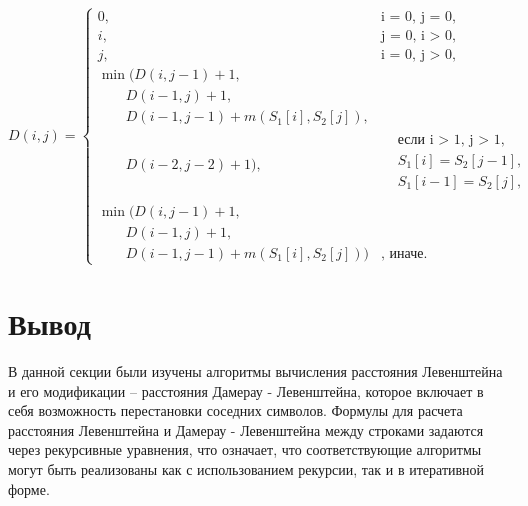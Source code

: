 \begin{equation}
	\label{eq:ref3}
	D(i, j) = 
	\begin{cases}
		0, &\text{i = 0, j = 0,}\\
		i, &\text{j = 0, i > 0,}\\
		j, &\text{i = 0, j > 0,}\\
		\min (  D(i, j - 1) + 1,\\
		\qquad D(i - 1, j) + 1,\\
		\qquad D(i - 1, j - 1) + m(S_{1}[i], S_{2}[j]), \\
		\qquad D(i - 2, j - 2) + 1 ),
		& \begin{aligned}
			& \text{если i > 1, j > 1}, \\
			& S_{1}[i] = S_{2}[j - 1], \\
			& S_{1}[i - 1] = S_{2}[j], \\
		\end{aligned}\\
		
		\min ( D(i, j - 1) + 1,\\
		\qquad  D(i - 1, j) + 1, \\
		\qquad  D(i - 1, j - 1) + m(S_{1}[i], S_{2}[j]) ) & \text{, иначе.}
	\end{cases}
\end{equation}

\vspace{30mm}

\section*{Вывод}
В данной секции были изучены алгоритмы вычисления расстояния Левенштейна и его модификации -- расстояния Дамерау - Левенштейна, которое включает в себя возможность перестановки соседних символов. 
Формулы для расчета расстояния Левенштейна и Дамерау - Левенштейна между строками задаются через рекурсивные уравнения, что означает, что соответствующие алгоритмы могут быть реализованы как с использованием рекурсии, так и в итеративной форме.
